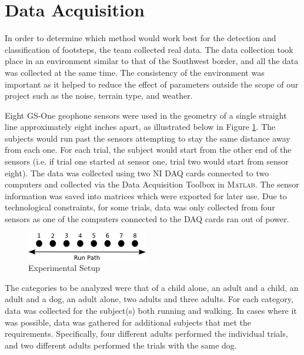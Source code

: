 \documentclass{article}[11pt]
\newcommand{\Matlab}{\textsc{Matlab}}
\begin{document}
\section{Data Acquisition}
\label{sec:data}
In order to determine which method would work best for the detection and classification of footsteps, the team collected real data. The data collection took place in an environment similar to that of the Southwest border, and all the data was collected at the same time. The consistency of the environment was important as it helped to reduce the effect of parameters outside the scope of our project such as the noise, terrain type, and weather. 

Eight GS-One geophone sensors were used in the geometry of a single straight line approximately eight inches apart, as illustrated below in Figure \ref{fig:Path}. The subjects would run past the sensors attempting to stay the same distance away from each one. For each trial, the subject would start from the other end of the sensors (i.e. if trial one started at sensor one, trial two would start from sensor eight). The data was collected using two NI DAQ cards connected to two computers and collected via the Data Acquisition Toolbox in \Matlab. The sensor information was saved into matrices which were exported for later use. Due to technological constraints, for some trials, data was only collected from four sensors as one of the computers connected to the DAQ cards ran out of power.

\begin{figure}[h!]
   \centering
   \includegraphics{Images/Path.png} 
   \caption{Experimental Setup}
   \label{fig:Path}
\end{figure}

The categories to be analyzed were that of a child alone, an adult and a child, an adult and a dog, an adult alone, two adults and three adults. For each category, data was collected for the subject(s) both running and walking. In cases where it was possible, data was gathered for additional subjects that met the requirements. Specifically, four different adults performed the individual trials, and two different adults performed the trials with the same dog. 
\end{document}

